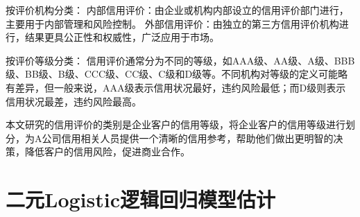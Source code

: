 按评价机构分类：
内部信用评价：由企业或机构内部设立的信用评价部门进行，主要用于内部管理和风险控制。
外部信用评价：由独立的第三方信用评价机构进行，结果更具公正性和权威性，广泛应用于市场。

按评价等级分类：
信用评价通常分为不同的等级，如AAA级、AA级、A级、BBB级、BB级、B级、CCC级、CC级、C级和D级等。不同机构对等级的定义可能略有差异，但一般来说，AAA级表示信用状况最好，违约风险最低；而D级则表示信用状况最差，违约风险最高。

本文研究的信用评价的类别是企业客户的信用等级，将企业客户的信用等级进行划分，为A公司信用相关人员提供一个清晰的信用参考，帮助他们做出更明智的决策，降低客户的信用风险，促进商业合作。 




\section{二元Logistic逻辑回归模型估计}



